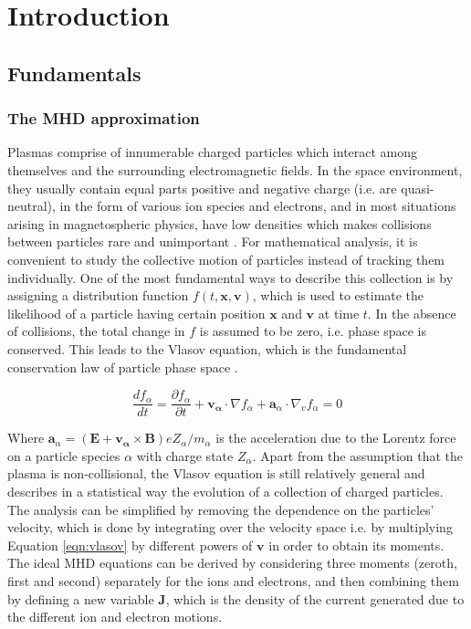 \chapter{Introduction}

\section{Fundamentals}


\subsection{The MHD approximation}

Plasmas comprise of innumerable charged particles which interact among themselves and the surrounding electromagnetic fields. In the space environment, they usually contain equal parts positive and negative charge (i.e. are quasi-neutral), in the form of various ion species and electrons, and in most situations arising in magnetospheric physics, have low densities which makes collisions between particles rare and unimportant \cite{Bruno2013TheLaboratory}. For mathematical analysis, it is convenient to study the collective motion of particles instead of tracking them individually. One of the most fundamental ways to describe this collection is by assigning a distribution function $f(t, \mathbf{x}, \mathbf{v})$, which is used to estimate the likelihood of a particle having certain position $\mathbf{x}$ and $\mathbf{v}$ at time $t$. In the absence of collisions, the total change in $f$ is assumed to be zero, i.e. phase space is conserved. This leads to the Vlasov equation, which is the fundamental conservation law of particle phase space \cite{Chen1995IntroductionPhysics,Gombosi1998PhysicsEnvironment}. 

\begin{equation}
    \frac{df_\alpha}{dt} = \frac{\partial f_\alpha}{\partial t} + \mathbf{v_\alpha}\cdot\nabla f_\alpha + \mathbf{a}_\alpha \cdot \nabla_v f_\alpha = 0
    \label{eqn:vlasov}
\end{equation}

Where $\mathbf{a}_\alpha = (\mathbf{E} + \mathbf{v_\alpha} \times \mathbf{B})e Z_\alpha/m_\alpha$ is the acceleration due to the Lorentz force on a particle species $\alpha$ with charge state $Z_\alpha$. Apart from the assumption that the plasma is non-collisional, the Vlasov equation is still relatively general and describes in a statistical way the evolution of a collection of charged particles. The analysis can be simplified by removing the dependence on the particles' velocity, which is done by integrating over the velocity space i.e. by multiplying Equation \ref{eqn:vlasov} by different powers of $\mathbf{v}$ in order to obtain its moments. The ideal MHD equations can be derived by considering three moments (zeroth, first and second) separately for the ions and electrons, and then combining them by defining a new variable $\mathbf{J}$, which is the density of the current generated due to the different ion and electron motions. 

